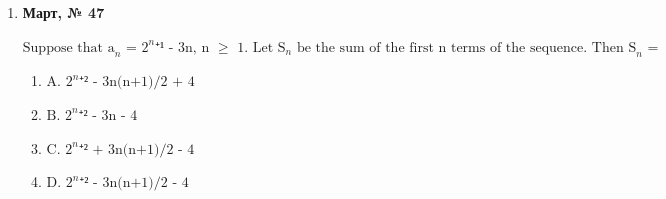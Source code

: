 \begin{enumerate}
$\displaystyle \text{In a sequence \{a}_{n}\text{\} , if a}_{1}\text{ = 1/2 and 1/a}_{n}\text{₊₁ = 1/a}_{n}\text{ + 1, n }\geq\text{  1, then a}_{6}\text{ =}$
\begin{enumerate}
\item $\displaystyle \text{A. 1/7}$
\item $\displaystyle \text{B. 1/6}$
\item $\displaystyle \text{C. 1/9}$
\item $\displaystyle \text{D. 1/8}$
\end{enumerate}
\item \textbf{Март, № 47} \par \smallskip
$\displaystyle \text{Suppose that a}_{n}\text{ = 2}^{n}\text{⁺¹ - 3n, n }\geq\text{  1. Let S}_{n}\text{ be the sum of the first n terms of the sequence. Then S}_{n}\text{ =}$
\begin{enumerate}
\item $\displaystyle \text{A. 2}^{n}\text{⁺² - 3n(n+1)/2 + 4}$
\item $\displaystyle \text{B. 2}^{n}\text{⁺² - 3n - 4}$
\item $\displaystyle \text{C. 2}^{n}\text{⁺² + 3n(n+1)/2 - 4}$
\item $\displaystyle \text{D. 2}^{n}\text{⁺² - 3n(n+1)/2 - 4}$
\end{enumerate}
\end{enumerate}

